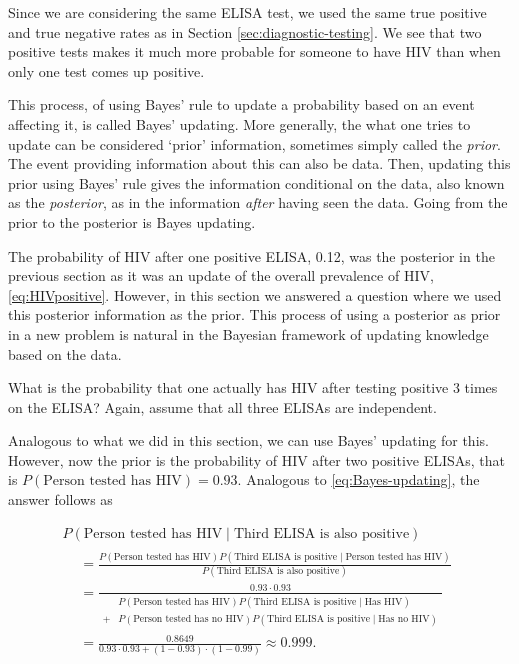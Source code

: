 \documentclass[]{book}
\theoremstyle{definition}
\theoremstyle{definition}
\theoremstyle{definition}
\theoremstyle{remark}
\let\BeginKnitrBlock\begin \let\EndKnitrBlock\end
\begin{document}
Since we are considering the same ELISA test, we used the same true
positive and true negative rates as in Section
\ref{sec:diagnostic-testing}. We see that two positive tests makes it
much more probable for someone to have HIV than when only one test comes
up positive.

This process, of using Bayes' rule to update a probability based on an
event affecting it, is called Bayes' updating. More generally, the what
one tries to update can be considered `prior' information, sometimes
simply called the \emph{prior}. The event providing information about
this can also be data. Then, updating this prior using Bayes' rule gives
the information conditional on the data, also known as the
\emph{posterior}, as in the information \emph{after} having seen the
data. Going from the prior to the posterior is Bayes updating.

The probability of HIV after one positive ELISA, 0.12, was the posterior
in the previous section as it was an update of the overall prevalence of
HIV, \eqref{eq:HIVpositive}. However, in this section we answered a
question where we used this posterior information as the prior. This
process of using a posterior as prior in a new problem is natural in the
Bayesian framework of updating knowledge based on the data.

\BeginKnitrBlock{example}
\protect\hypertarget{exm:unnamed-chunk-6}{}{\label{exm:unnamed-chunk-6}
}What is the probability that one actually has HIV after testing
positive 3 times on the ELISA? Again, assume that all three ELISAs are
independent.
\EndKnitrBlock{example}

Analogous to what we did in this section, we can use Bayes' updating for
this. However, now the prior is the probability of HIV after two
positive ELISAs, that is \(P(\text{Person tested has HIV}) = 0.93\).
Analogous to \eqref{eq:Bayes-updating}, the answer follows as

\begin{multline}
  P(\text{Person tested has HIV} \mid \text{Third ELISA is also positive}) \\
  \begin{split}
  &= \frac{P(\text{Person tested has HIV}) P(\text{Third ELISA is positive} \mid \text{Person tested has HIV})}{P(\text{Third ELISA is also positive})} \\
  &= \frac{0.93 \cdot 0.93}{\begin{split}
  &P(\text{Person tested has HIV}) P(\text{Third ELISA is positive} \mid \text{Has HIV}) \\
  + &P(\text{Person tested has no HIV}) P(\text{Third ELISA is positive} \mid \text{Has no HIV})
  \end{split}} \\
  &= \frac{0.8649}{0.93 \cdot 0.93 + (1 - 0.93)\cdot (1 - 0.99)} \approx 0.999.
  \end{split}
\end{multline}
\end{document}

